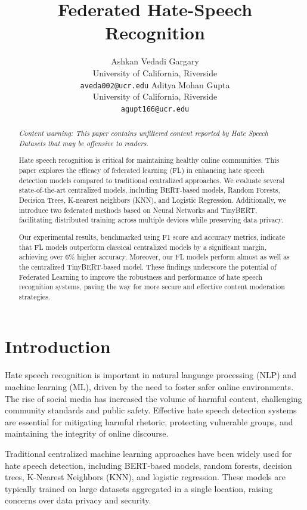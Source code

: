 \documentclass[11pt]{article}
\title{Federated Hate-Speech Recognition}
\author{
    Ashkan Vedadi Gargary \\ University of California, Riverside\\ \texttt{aveda002@ucr.edu} 
    \AND
    Aditya Mohan Gupta \\ University of California, Riverside\\ \texttt{agupt166@ucr.edu}
  }
\begin{document}
\maketitle
\pagestyle{fancy}
\fancyhf{}
\fancyfoot[C]{\thepage}
\renewcommand{\headrulewidth}{0pt}
\begin{abstract}
\textit{Content warning: This paper contains unfiltered content reported by Hate Speech Datasets that may be offensive to readers.}

Hate speech recognition is critical for maintaining healthy online communities. This paper explores the efficacy of federated learning (FL) in enhancing hate speech detection models compared to traditional centralized approaches. We evaluate several state-of-the-art centralized models, including BERT-based models, Random Forests, Decision Trees, K-nearest neighbors (KNN), and Logistic Regression. Additionally, we introduce two federated methods based on Neural Networks and TinyBERT, facilitating distributed training across multiple devices while preserving data privacy.

Our experimental results, benchmarked using F1 score and accuracy metrics, indicate that FL models outperform classical centralized models by a significant margin, achieving over $6\%$ higher accuracy. Moreover, our FL models perform almost as well as the centralized TinyBERT-based model. These findings underscore the potential of Federated Learning to improve the robustness and performance of hate speech recognition systems, paving the way for more secure and effective content moderation strategies.


\end{abstract}

\section{Introduction}
Hate speech recognition is important in natural language processing (NLP) and machine learning (ML), driven by the need to foster safer online environments. The rise of social media has increased the volume of harmful content, challenging community standards and public safety. Effective hate speech detection systems are essential for mitigating harmful rhetoric, protecting vulnerable groups, and maintaining the integrity of online discourse.

Traditional centralized machine learning approaches have been widely used for hate speech detection, including BERT-based models, random forests, decision trees, K-Nearest Neighbors (KNN), and logistic regression. These models are typically trained on large datasets aggregated in a single location, raising concerns over data privacy and security. 
\end{document}
